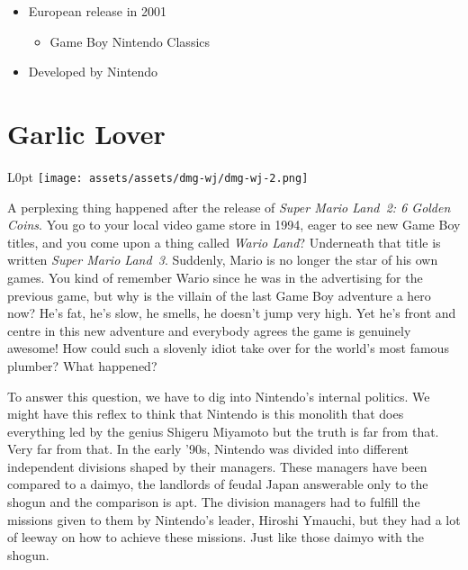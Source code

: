 \documentclass{book}
\begin{document}
\begin{itemize} [nosep]
\item European release in 2001
\begin{itemize} [nosep]\item Game Boy Nintendo Classics\end{itemize}\noindent




































\item Developed by Nintendo

\end{itemize}\noindent

\newpage\FloatBarrier\needspace{10mm}\section*{Garlic Lover}\nopagebreak[4]
\begin{wrapfigure}{L}{0pt} \texttt{[image: assets/assets/dmg-wj/dmg-wj-2.png]}\end{wrapfigure}
A perplexing thing happened after the release of \emph{Super Mario Land 2: 6 Golden Coins}. You go to your local video game store in 1994, eager to see new Game Boy titles, and you come upon a thing called \emph{Wario Land}? Underneath that title is written \emph{Super Mario Land 3}. Suddenly, Mario is no longer the star of his own games. You kind of remember Wario since he was in the advertising for the previous game, but why is the villain of the last Game Boy adventure a hero now? He’s fat, he’s slow, he smells, he doesn’t jump very high. Yet he’s front and centre in this new adventure and everybody agrees the game is genuinely awesome! How could such a slovenly idiot take over for the world’s most famous plumber? What happened?

To answer this question, we have to dig into Nintendo’s internal politics. We might have this reflex to think that Nintendo is this monolith that does everything led by the genius Shigeru Miyamoto but the truth is far from that. Very far from that. In the early ’90s, Nintendo was divided into different independent divisions shaped by their managers. These managers have been compared to a daimyo, the landlords of feudal Japan answerable only to the shogun and the comparison is apt. The division managers had to fulfill the missions given to them by Nintendo’s leader, Hiroshi Ymauchi, but they had a lot of leeway on how to achieve these missions. Just like those daimyo with the shogun.
\end{document}

